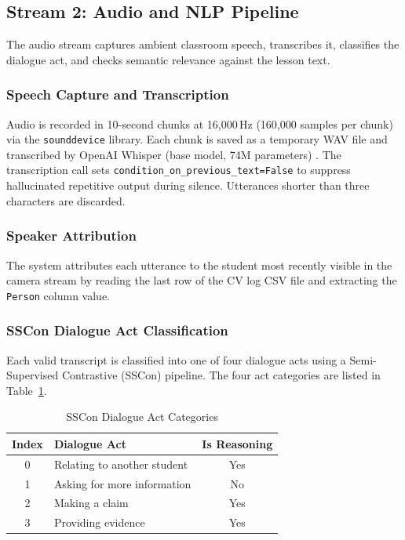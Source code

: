 \documentclass[conference]{IEEEtran}
\begin{document}
\subsection{Stream 2: Audio and NLP Pipeline}

The audio stream captures ambient classroom speech, transcribes it, classifies the dialogue act, and checks semantic relevance against the lesson text.

\subsubsection{Speech Capture and Transcription}
Audio is recorded in 10-second chunks at 16{,}000\,Hz (160{,}000 samples per chunk) via the \texttt{sounddevice} library. Each chunk is saved as a temporary WAV file and transcribed by OpenAI Whisper (base model, 74M parameters) \cite{radford2023}. The transcription call sets \texttt{condition\_on\_previous\_text=False} to suppress hallucinated repetitive output during silence. Utterances shorter than three characters are discarded.

\subsubsection{Speaker Attribution}
The system attributes each utterance to the student most recently visible in the camera stream by reading the last row of the CV log CSV file and extracting the \texttt{Person} column value.

\subsubsection{SSCon Dialogue Act Classification}
Each valid transcript is classified into one of four dialogue acts using a Semi-Supervised Contrastive (SSCon) pipeline. The four act categories are listed in Table~\ref{tab:acts}.

\begin{table}[htbp]
\caption{SSCon Dialogue Act Categories}
\begin{center}
\begin{tabular}{|c|l|c|}
\hline
\textbf{Index} & \textbf{Dialogue Act} & \textbf{Is Reasoning} \\
\hline
0 & Relating to another student & Yes \\
1 & Asking for more information & No \\
2 & Making a claim & Yes \\
3 & Providing evidence & Yes \\
\hline
\end{tabular}
\label{tab:acts}
\end{center}
\end{table}
\end{document}
